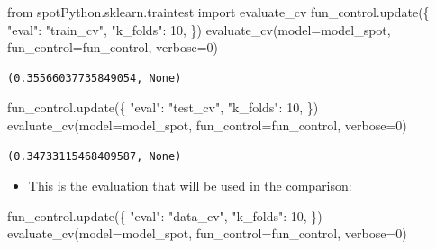 \documentclass[
  letterpaper,
  DIV=11,
  numbers=noendperiod]{scrreprt}
\newenvironment{Shaded}{\begin{snugshade}}{\end{snugshade}}
\newcommand{\DecValTok}[1]{\textcolor[rgb]{0.68,0.00,0.00}{#1}}
\newcommand{\ImportTok}[1]{\textcolor[rgb]{0.00,0.46,0.62}{#1}}
\newcommand{\NormalTok}[1]{\textcolor[rgb]{0.00,0.23,0.31}{#1}}
\newcommand{\OperatorTok}[1]{\textcolor[rgb]{0.37,0.37,0.37}{#1}}
\newcommand{\StringTok}[1]{\textcolor[rgb]{0.13,0.47,0.30}{#1}}
\providecommand{\tightlist}{%
  \setlength{\itemsep}{0pt}\setlength{\parskip}{0pt}}\usepackage{longtable,booktabs,array}
\begin{document}
\begin{Shaded}
\begin{Highlighting}[]
\ImportTok{from}\NormalTok{ spotPython.sklearn.traintest }\ImportTok{import}\NormalTok{ evaluate\_cv}
\NormalTok{fun\_control.update(\{}
     \StringTok{"eval"}\NormalTok{: }\StringTok{"train\_cv"}\NormalTok{,}
     \StringTok{"k\_folds"}\NormalTok{: }\DecValTok{10}\NormalTok{,}
\NormalTok{\})}
\NormalTok{evaluate\_cv(model}\OperatorTok{=}\NormalTok{model\_spot, fun\_control}\OperatorTok{=}\NormalTok{fun\_control, verbose}\OperatorTok{=}\DecValTok{0}\NormalTok{)}
\end{Highlighting}
\end{Shaded}

\begin{verbatim}
(0.35566037735849054, None)
\end{verbatim}

\begin{Shaded}
\begin{Highlighting}[]
\NormalTok{fun\_control.update(\{}
     \StringTok{"eval"}\NormalTok{: }\StringTok{"test\_cv"}\NormalTok{,}
     \StringTok{"k\_folds"}\NormalTok{: }\DecValTok{10}\NormalTok{,}
\NormalTok{\})}
\NormalTok{evaluate\_cv(model}\OperatorTok{=}\NormalTok{model\_spot, fun\_control}\OperatorTok{=}\NormalTok{fun\_control, verbose}\OperatorTok{=}\DecValTok{0}\NormalTok{)}
\end{Highlighting}
\end{Shaded}

\begin{verbatim}
(0.34733115468409587, None)
\end{verbatim}

\begin{itemize}
\tightlist
\item
  This is the evaluation that will be used in the comparison:
\end{itemize}

\begin{Shaded}
\begin{Highlighting}[]
\NormalTok{fun\_control.update(\{}
     \StringTok{"eval"}\NormalTok{: }\StringTok{"data\_cv"}\NormalTok{,}
     \StringTok{"k\_folds"}\NormalTok{: }\DecValTok{10}\NormalTok{,}
\NormalTok{\})}
\NormalTok{evaluate\_cv(model}\OperatorTok{=}\NormalTok{model\_spot, fun\_control}\OperatorTok{=}\NormalTok{fun\_control, verbose}\OperatorTok{=}\DecValTok{0}\NormalTok{)}
\end{Highlighting}
\end{Shaded}
\end{document}
